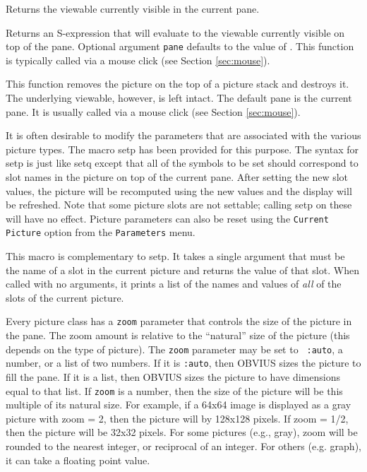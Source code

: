 \begin{description}
\item{}
Returns the viewable currently visible in the current pane.

\item{}
Returns an S-expression that will evaluate to the viewable currently
visible on top of the pane.  Optional argument {\tt pane} defaults to the value of
.   This function is typically called via a mouse
click (see Section \ref{sec:mouse}).

\item{}
This function removes the picture on the top of a picture stack and
destroys it.  The underlying viewable, however, is left intact.  The
default pane is the current pane.  It is usually called via a mouse
click (see Section \ref{sec:mouse}).

\item{}
It is often desirable to modify the parameters that are associated
with the various picture types.  The macro setp has been provided for
this purpose.  The syntax for setp is just like setq except that all
of the symbols to be set should correspond to slot names in the
picture on top of the current pane.  After setting the new slot
values, the picture will be recomputed using the new values and the
display will be refreshed.  Note that some picture slots are not
settable; calling setp on these will have no effect.  Picture
parameters can also be reset using the {\tt Current Picture} option
from the {\tt Parameters} menu.

\item{}
This macro is complementary to setp.  It takes a single argument that
must be the name of a slot in the current picture and returns the
value of that slot.  When called with no arguments, it prints a list
of the names and values of {\em all} of the slots of the current
picture.  
\end{description}


Every picture class has a {\tt zoom} parameter that
controls the size of the picture in the pane.  The zoom amount is
relative to the ``natural'' size of the picture (this depends on the
type of picture).  The {\tt zoom} parameter may be set to {\tt
:auto}, a number, or a list of two numbers.  If it
is {\tt :auto}, then OBVIUS sizes the picture to fill the pane.  If it
is a list, then OBVIUS sizes the picture to have dimensions equal to
that list.  If {\tt zoom} is a number, then the size of the picture
will be this multiple of its natural size.  For example, if a 64x64
image is displayed as a gray picture with zoom = 2, then the picture
will by 128x128 pixels.  If zoom = 1/2, then the picture will be 32x32
pixels.  For some pictures (e.g., gray), zoom will be rounded to the
nearest integer, or reciprocal of an integer.  For others (e.g.
graph), it can take a floating point value.

